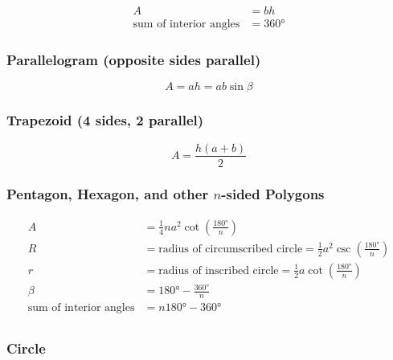 \documentclass[
]{book}
\begin{document}
\begin{align}
A &= bh\\
\text{sum of interior angles} &= 360°
\end{align}

\hypertarget{parallelogram-opposite-sides-parallel}{%
\subsubsection*{Parallelogram (opposite sides parallel)}\label{parallelogram-opposite-sides-parallel}}

\[ A = ah = ab \sin \beta \]

\hypertarget{trapezoid-4-sides-2-parallel}{%
\subsubsection*{Trapezoid (4 sides, 2 parallel)}\label{trapezoid-4-sides-2-parallel}}

\[ A = \frac{h \left(a + b \right)}{2} \]

\hypertarget{pentagon-hexagon-and-other-n-sided-polygons}{%
\subsubsection*{\texorpdfstring{Pentagon, Hexagon, and other \(n\)-sided Polygons}{Pentagon, Hexagon, and other n-sided Polygons}}\label{pentagon-hexagon-and-other-n-sided-polygons}}

\begin{align}
A &= \frac{1}{4} n a^2 \cot \left( \frac{180°}{n} \right) \\
R &= \text{radius of circumscribed circle} = \frac{1}{2} a^2 \csc \left( \frac{180°}{n} \right) \\
r &= \text{radius of inscribed circle} = \frac{1}{2} a \cot \left( \frac{180°}{n} \right) \\
\beta &= 180° - \frac{360°}{n} \\
\text{sum of interior angles} &= n 180° - 360° \\
\end{align}

\hypertarget{circle}{%
\subsubsection*{Circle}\label{circle}}
\end{document}
